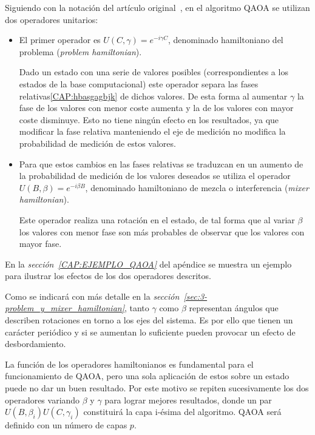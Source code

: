 Siguiendo con la notación del artículo original~\cite{qaoa_paper_original}, en el algoritmo QAOA se utilizan dos operadores unitarios:
\begin{itemize}
\item El primer operador es $U(C, \gamma) = e^{-i \gamma C}$, denominado hamiltoniano del problema (\textit{problem hamiltonian}).

  Dado un estado con una serie de valores posibles (correspondientes a los estados de la base computacional) este operador separa las fases relativas\ref{CAP:hbasgagbjk} de dichos valores.
  De esta forma al aumentar $\gamma$ la fase de los valores con menor coste aumenta y la de los valores con mayor coste disminuye.
  Esto no tiene ningún efecto en los resultados, ya que modificar la fase relativa manteniendo el eje de medición no modifica la probabilidad de medición de estos valores.

\item Para que estos cambios en las fases relativas se traduzcan en un aumento de la probabilidad de medición de los valores deseados se utiliza el operador $U(B, \beta) = e^{-i \beta B}$, denominado hamiltoniano de mezcla o interferencia (\textit{mixer hamiltonian}).

  Este operador realiza una rotación en el estado, de tal forma que al variar $\beta$ los valores con menor fase son más probables de observar que los valores con mayor fase.

\end{itemize}

En la \textit{sección~\ref{CAP:EJEMPLO_QAOA}} del apéndice se muestra un ejemplo para ilustrar los efectos de los dos operadores descritos.

Como se indicará con más detalle en la \textit{sección~\ref{sec:3-problem_y_mixer_hamiltonian}}, tanto $\gamma$ como $\beta$ representan ángulos que describen rotaciones en torno a los ejes del sistema.
Es por ello que tienen un carácter periódico y si se aumentan lo suficiente pueden provocar un efecto de desbordamiento.

La función de los operadores hamiltonianos es fundamental para el funcionamiento de QAOA, pero una sola aplicación de estos sobre un estado puede no dar un buen resultado.
Por este motivo se repiten sucesivamente los dos operadores variando $\beta$ y $\gamma$ para lograr mejores resultados, donde un par $U(B, \beta_i)U(C, \gamma_i)$ constituirá la capa i-ésima del algoritmo.
QAOA será definido con un número de capas $p$.


